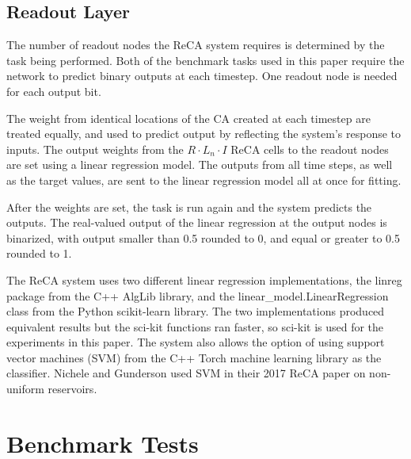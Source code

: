 \documentclass{elsarticle}
\begin{document}
\begin{multicols}{2}
	\subsection{Readout Layer}
	The number of readout nodes the ReCA system requires is determined by the task 
	being  performed. Both of the benchmark tasks used in this paper require the 
	network to predict binary outputs at each timestep. One readout node is needed 
	for each output bit. \par The weight from identical locations of the CA created 
	at each timestep are treated equally, and used to predict output by 
	reflecting the system's response to inputs. The output weights from the 
	$R \cdot L_{n} \cdot I$ ReCA cells to the readout nodes are set using a 
	linear regression model.  The outputs from all time steps, as well as the 
	target values, are sent to the linear regression model all at once for 
	fitting.  \par
	After the weights are set, the task is run again and the system predicts the 
	outputs. The real-valued output of the linear regression at the output nodes is 
	binarized, with output smaller than 0.5 rounded to 0, and equal or greater to 
	0.5 rounded to 1. \par The ReCA system uses two different linear regression 
	implementations, the linreg package from the C++ AlgLib library, and the 
	linear\_model.LinearRegression class from the Python scikit-learn library.  The 
	two implementations produced equivalent results but the sci-kit functions ran 
	faster, so sci-kit is used for the experiments in this paper. The system also 
	allows the option of  using support vector machines (SVM) from the C++ Torch 
	machine learning library as the classifier.  Nichele and 
	Gunderson used SVM in their 2017 ReCA paper on non-uniform 
	reservoirs\cite{nichele2017reservoir}.
	
	\section{Benchmark Tests}\label{Benchmarks}

\end{multicols}
\end{document}
